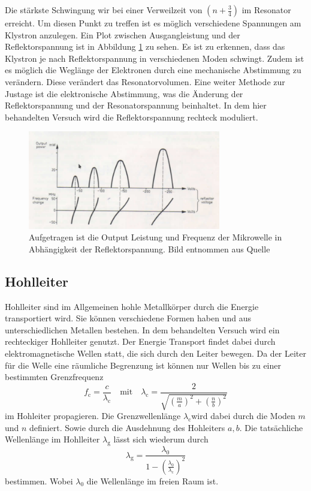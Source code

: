 Die stärkste Schwingung wir bei einer Verweilzeit von $(n + \frac{3}{4})$ im Resonator erreicht.
Um diesen Punkt zu treffen ist es möglich verschiedene Spannungen am Klystron anzulegen.
Ein Plot zwischen Ausgangleistung und der Reflektorspannung ist in Abbildung \ref{fig:output_refelktor_voltage} zu sehen.
Es ist zu erkennen, dass das Klystron je nach Reflektorspannung in verschiedenen Moden schwingt.
Zudem ist es möglich die Weglänge der Elektronen durch eine mechanische Abstimmung zu verändern.
Diese verändert das Resonatorvolumen.
Eine weiter Methode zur Justage ist die elektronische Abstimmung, was die Änderung der Reflektorspannung und der Resonatorspannung beinhaltet.
In dem hier behandelten Versuch wird die Reflektorspannung rechteck moduliert.

\begin{figure}
    \centering
    \includegraphics[width=0.75\textwidth]{content/data/refelx_spannung_schema.png}
    \caption{Aufgetragen ist die Output Leistung und Frequenz der Mikrowelle in Abhängigkeit der Reflektorspannung. Bild entnommen aus Quelle \cite[6]{Anleitung}}
    \label{fig:output_refelktor_voltage}
\end{figure}
\FloatBarrier
\subsection{Hohlleiter}
Hohlleiter sind im Allgemeinen hohle Metallkörper durch die Energie transportiert wird.
Sie können verschiedene Formen haben und aus unterschiedlichen Metallen bestehen.
In dem behandelten Versuch wird ein rechteckiger Hohlleiter genutzt.
Der Energie Transport findet dabei durch elektromagnetische Wellen statt, die sich durch den Leiter bewegen.
Da der Leiter für die Welle eine räumliche Begrenzung ist können nur Wellen bis zu einer bestimmten Grenzfrequenz
\begin{equation}
    f_\text{c} = \frac{c}{\lambda _\text{c}} \quad \text{mit} \quad \lambda _\text{c} = \frac{2}{\sqrt{ \left ( \frac{m}{a} \right )^2 + \left ( \frac{n}{b} \right )^2}}
    \label{eq:grenzwellenlaenge}
\end{equation}
im Hohleiter propagieren.
Die Grenzwellenlänge $\lambda _\text{c} $wird dabei durch die Moden $m$ und $n$ definiert. Sowie durch die Ausdehnung des Hohleiters $a, b$.
Die tatsächliche Wellenlänge im Hohlleiter $\lambda _\text{g}$ lässt sich wiederum durch 
\begin{equation}
    \lambda _\text{g} = \frac{\lambda _{0}}{1 - \left ( \frac{\lambda _0}{\lambda _\text{c}} \right )^2}
    \label{eq:wellenlaenge_hohleiter}
\end{equation}
bestimmen.
Wobei $\lambda _0$ die Wellenlänge im freien Raum ist.

